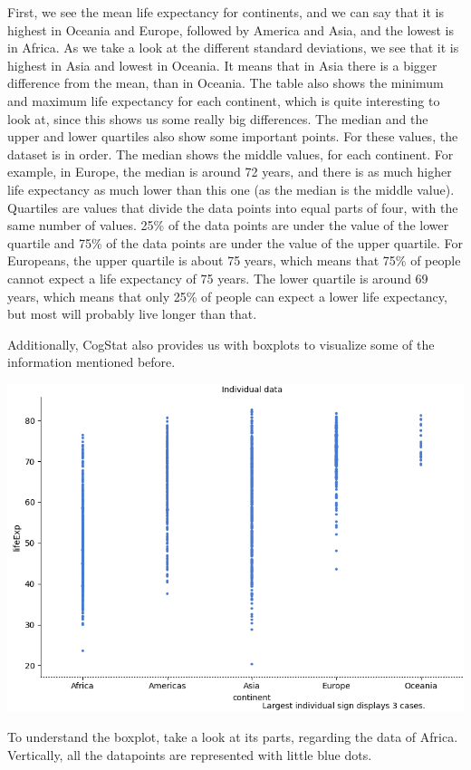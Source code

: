 \documentclass[
]{book}
\begin{document}
First, we see the mean life expectancy for continents, and we can say that it is highest in Oceania and Europe, followed by America and Asia, and the lowest is in Africa. As we take a look at the different standard deviations, we see that it is highest in Asia and lowest in Oceania. It means that in Asia there is a bigger difference from the mean, than in Oceania. The table also shows the minimum and maximum life expectancy for each continent, which is quite interesting to look at, since this shows us some really big differences. The median and the upper and lower quartiles also show some important points. For these values, the dataset is in order. The median shows the middle values, for each continent. For example, in Europe, the median is around 72 years, and there is as much higher life expectancy as much lower than this one (as the median is the middle value). Quartiles are values that divide the data points into equal parts of four, with the same number of values. 25\% of the data points are under the value of the lower quartile and 75\% of the data points are under the value of the upper quartile. For Europeans, the upper quartile is about 75 years, which means that 75\% of people cannot expect a life expectancy of 75 years. The lower quartile is around 69 years, which means that only 25\% of people can expect a lower life expectancy, but most will probably live longer than that.

Additionally, CogStat also provides us with boxplots to visualize some of the information mentioned before.

\includegraphics{img/ch2/cgindivdata.png}

To understand the boxplot, take a look at its parts, regarding the data of Africa. Vertically, all the datapoints are represented with little blue dots.
\end{document}
